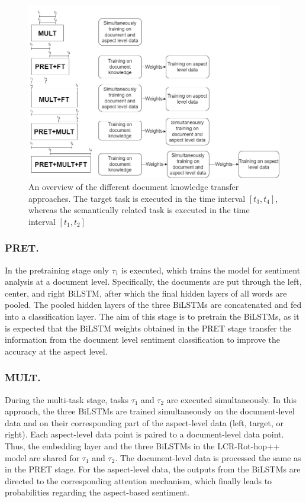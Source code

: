 \begin{figure}[h!!!!!]
    \centering
    \includegraphics[width=\textwidth]{Images/PRET_MULT.jpg}
    \caption{An overview of the different document knowledge transfer approaches. The target task is executed in the time interval $[t_3, t_4]$, whereas the semantically related task is executed in the time interval $[t_1, t_2]$}
    \label{fig:pretmultft}
\end{figure}

\subsubsection{PRET.}
In the pretraining stage only $\tau_1$ is executed, which trains the model for sentiment analysis at a document level. Specifically, the documents are put through the left, center, and right BiLSTM, after which the final hidden layers of all words are pooled. The pooled hidden layers of the three BiLSTMs are concatenated and fed into a classification layer. The aim of this stage is to pretrain the BiLSTMs, as it is expected that the BiLSTM weights obtained in the PRET stage transfer the information from the document level sentiment classification to improve the accuracy at the aspect level.

\subsubsection{MULT.}
During the multi-task stage, tasks $\tau_1$ and $\tau_2$ are executed simultaneously.  In this approach, the three BiLSTMs are trained simultaneously on the document-level data and on their corresponding part of the aspect-level data (left, target, or right). Each aspect-level data point is paired to a document-level data point. Thus, the embedding layer and the three BiLSTMs in the LCR-Rot-hop++ model are shared for $\tau_1$ and $\tau_2$. The document-level data is processed the same as in the PRET stage. For the aspect-level data, the outputs from the BiLSTMs are directed to the corresponding attention mechanism, which finally leads to probabilities regarding the aspect-based sentiment.

